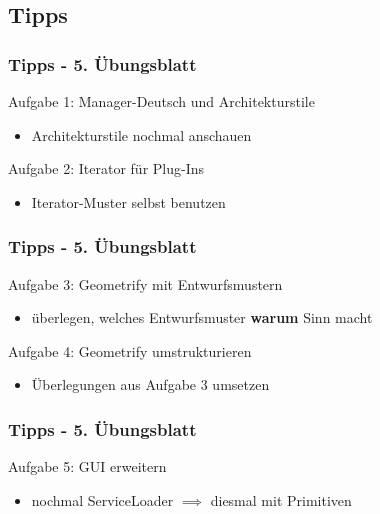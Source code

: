 \documentclass[18pt]{beamer}
\begin{document}
	\subsection{Tipps}
	\begin{frame}
		\frametitle{Tipps - 5. Übungsblatt}
			\begin{exampleblock}{Aufgabe 1: Manager-Deutsch und Architekturstile} 
				\begin{itemize}
					\item Architekturstile nochmal anschauen
				\end{itemize}
			\end{exampleblock}
			\pause
			\begin{exampleblock}{Aufgabe 2: Iterator für Plug-Ins} 
				\begin{itemize}
					\item Iterator-Muster selbst benutzen
				\end{itemize}
			\end{exampleblock}
	\end{frame}

	\begin{frame}
		\frametitle{Tipps - 5. Übungsblatt}
			\begin{exampleblock}{Aufgabe 3: Geometrify mit Entwurfsmustern}
				\begin{itemize}
					\item überlegen, welches Entwurfsmuster \textbf{warum} Sinn macht
				\end{itemize}
			\end{exampleblock}
			\pause
			\begin{exampleblock}{Aufgabe 4: Geometrify umstrukturieren}
				\begin{itemize}
					\item Überlegungen aus Aufgabe 3 umsetzen
				\end{itemize}
			\end{exampleblock}
	\end{frame}

	\begin{frame}
		\frametitle{Tipps - 5. Übungsblatt}
		\begin{exampleblock}{Aufgabe 5: GUI erweitern}
			\begin{itemize}
				\item nochmal ServiceLoader
			 	 $\implies$ diesmal mit Primitiven
			\end{itemize}
		\end{exampleblock}
	\end{frame}
	
\end{document}
